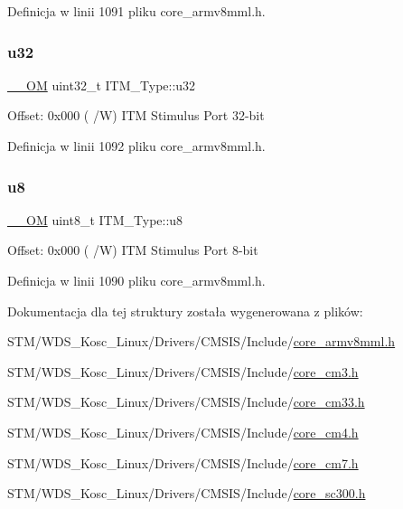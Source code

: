 Definicja w linii 1091 pliku core\+\_\+armv8mml.\+h.

\mbox{\label{struct_i_t_m___type_a5834885903a557674f078f3b71fa8bc8}} 
\subsubsection{\texorpdfstring{u32}{u32}}
{\footnotesize\ttfamily \hyperlink{core__sc300_8h_a0ea2009ed8fd9ef35b48708280fdb758}{\+\_\+\+\_\+\+OM} uint32\+\_\+t I\+T\+M\+\_\+\+Type\+::u32}

Offset\+: 0x000 ( /W) I\+TM Stimulus Port 32-\/bit 

Definicja w linii 1092 pliku core\+\_\+armv8mml.\+h.

\mbox{\label{struct_i_t_m___type_ae773bf9f9dac64e6c28b14aa39f74275}} 
\subsubsection{\texorpdfstring{u8}{u8}}
{\footnotesize\ttfamily \hyperlink{core__sc300_8h_a0ea2009ed8fd9ef35b48708280fdb758}{\+\_\+\+\_\+\+OM} uint8\+\_\+t I\+T\+M\+\_\+\+Type\+::u8}

Offset\+: 0x000 ( /W) I\+TM Stimulus Port 8-\/bit 

Definicja w linii 1090 pliku core\+\_\+armv8mml.\+h.



Dokumentacja dla tej struktury została wygenerowana z plików\+:\begin{DoxyCompactItemize}
\item 
S\+T\+M/\+W\+D\+S\+\_\+\+Kosc\+\_\+\+Linux/\+Drivers/\+C\+M\+S\+I\+S/\+Include/\hyperlink{core__armv8mml_8h}{core\+\_\+armv8mml.\+h}\item 
S\+T\+M/\+W\+D\+S\+\_\+\+Kosc\+\_\+\+Linux/\+Drivers/\+C\+M\+S\+I\+S/\+Include/\hyperlink{core__cm3_8h}{core\+\_\+cm3.\+h}\item 
S\+T\+M/\+W\+D\+S\+\_\+\+Kosc\+\_\+\+Linux/\+Drivers/\+C\+M\+S\+I\+S/\+Include/\hyperlink{core__cm33_8h}{core\+\_\+cm33.\+h}\item 
S\+T\+M/\+W\+D\+S\+\_\+\+Kosc\+\_\+\+Linux/\+Drivers/\+C\+M\+S\+I\+S/\+Include/\hyperlink{core__cm4_8h}{core\+\_\+cm4.\+h}\item 
S\+T\+M/\+W\+D\+S\+\_\+\+Kosc\+\_\+\+Linux/\+Drivers/\+C\+M\+S\+I\+S/\+Include/\hyperlink{core__cm7_8h}{core\+\_\+cm7.\+h}\item 
S\+T\+M/\+W\+D\+S\+\_\+\+Kosc\+\_\+\+Linux/\+Drivers/\+C\+M\+S\+I\+S/\+Include/\hyperlink{core__sc300_8h}{core\+\_\+sc300.\+h}\end{DoxyCompactItemize}
